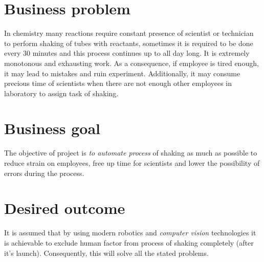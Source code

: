 \section{Business problem}

In chemistry many reactions require constant presence of scientist or technician to perform shaking of tubes with reactants, sometimes
it is required to be done every 30 minutes and this process continues up to all day long. It is extremely monotonous
and exhausting work. As a consequence, if employee is tired enough, it may lead to mistakes and ruin experiment. Additionally,
it may consume precious time of scientists when there are not enough other employees in laboratory to assign task of shaking.


\section{Business goal}

The objective of project is \textit{to automate process} of shaking as much as possible to reduce strain on employees, free up time
for scientists and lower the possibility of errors during the process.  


\section{Desired outcome}

It is assumed that by using modern robotics and \textit{computer vision} technologies it is achievable to exclude human factor from process
of shaking completely (after it's launch). Consequently, this will solve all the stated problems.
